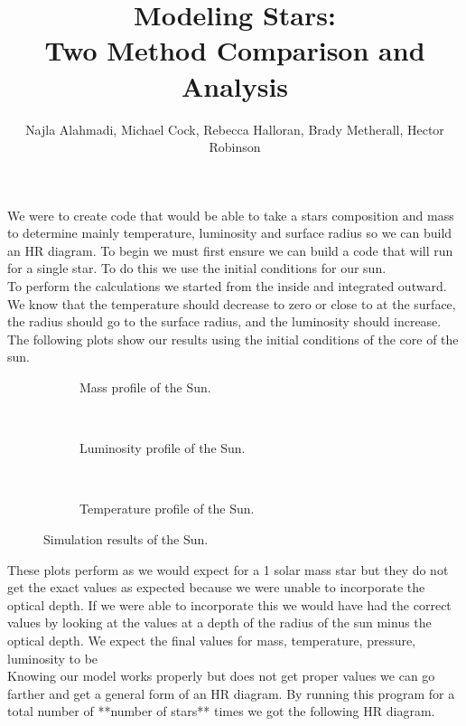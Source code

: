 \documentclass[10pt]{article}
\title{Modeling Stars: \\ Two Method Comparison and Analysis}
\author{Najla Alahmadi, Michael Cock, Rebecca Halloran, Brady Metherall, Hector Robinson}
\begin{document}
\maketitle

We were to create code that would be able to take a stars composition and mass to determine mainly temperature, luminosity and surface radius so we can build an HR diagram. To begin we must first ensure we can build a code that will run for a single star. To do this we use the initial conditions for our sun. \\

To perform the calculations we started from the inside and integrated outward. We know that the temperature should decrease to zero or close to at the surface, the radius should go to the surface radius, and the luminosity should increase. The following plots show our results using the initial conditions of the core of the sun. \\

\begin{figure}[p]
\begin{centering}
 \begin{subfigure}{\textwidth}
  
  \caption{Mass profile of the Sun.}
 \end{subfigure} \\
 \begin{subfigure}{\textwidth}
  
  \caption{Luminosity profile of the Sun.}
 \end{subfigure} \\
  \begin{subfigure}{\textwidth}
  
  \caption{Temperature profile of the Sun.}
 \end{subfigure}
 \caption{Simulation results of the Sun.}
 \end{centering}
\end{figure}

These plots perform as we would expect for a 1 solar mass star but they do not get the exact values as expected because we were unable to incorporate the optical depth. If we were able to incorporate this we would have had the correct values by looking at the values at a depth of the radius of the sun minus the optical depth. We expect the final values for mass, temperature, pressure, luminosity to be \\

Knowing our model works properly but does not get proper values we can go farther and get a general form of an HR diagram. By running this program for a total number of **number of stars** times we got the following HR diagram. \\
\end{document}
